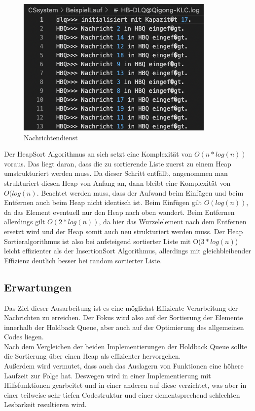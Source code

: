 \begin{figure}[htbp]
\begin{center}
\includegraphics[scale=0.6]{Bilder/HBQFilesEntry.png}
\caption{\label{fig:HBQFilesEntry2} Nachrichtendienst \cite{HBQlogging}} 
\end{center}
\end{figure}

Der HeapSort Algorithmus an sich setzt eine Komplexität von $O(n*log(n))$ voraus. Das liegt daran, dass die zu sortierende Liste zuerst zu einem Heap umstrukturiert werden muss. Da dieser Schritt entfällt, angenommen man strukturiert diesen Heap von Anfang an, dann bleibt eine Komplexität von $O(log(n)$. Beachtet werden muss, dass der Aufwand beim Einfügen und beim Entfernen auch beim Heap nicht identisch ist. Beim Einfügen gilt $O(log(n))$, da das Element eventuell nur den Heap nach oben wandert. Beim Entfernen allerdings gilt $O(2*log(n))$, da hier das Wurzelelement nach dem Entfernen ersetzt wird und der Heap somit auch neu strukturiert werden muss. Der Heap Sortieralgorithmus ist also bei aufsteigend sortierter Liste mit O($3*log(n)$) leicht effizienter als der InsertionSort Algorithmus, allerdings mit gleichbleibender Effizienz deutlich besser bei random sortierter Liste. 

\subsection{Erwartungen} \label{erwartungen}

Das Ziel dieser Ausarbeitung ist es eine möglichst Effiziente Verarbeitung der Nachrichten zu erreichen. Der Fokus wird also auf der Sortierung der Elemente innerhalb der Holdback Queue, aber auch auf der Optimierung des allgemeinen Codes liegen.\\
Nach dem Vergleichen der beiden Implementierungen der Holdback Queue sollte die Sortierung über einen Heap als effizienter hervorgehen.\\
Außerdem wird vermutet, dass auch das Auslagern von Funktionen eine höhere Laufzeit zur Folge hat. Deswegen wird in einer Implementierung mit Hilfsfunktionen gearbeitet und in einer anderen auf diese verzichtet, was aber in einer teilweise sehr tiefen Codestruktur und einer dementsprechend schlechten Lesbarkeit resultieren wird. 
